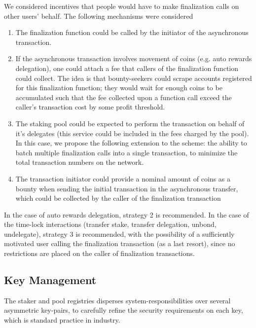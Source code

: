 We considered incentives that people would have to make finalization calls on other users' behalf. The following mechanisms were considered
\begin{enumerate}
    \item The finalization function could be called by the initiator of the asynchronous transaction. 
    \item If the asynchronous transaction involves movement of coins (e.g. auto rewards delegation), one could attach a fee that callers of the finalization function could collect. The idea is that bounty-seekers could scrape accounts registered for this finalization function; they would wait for enough coins to be accumulated such that the fee collected upon a function call exceed the caller's transaction cost by some profit threshold. 
    \item The staking pool could be expected to perform the transaction on behalf of it's delegates (this service could be included in the fees charged by the pool). In this case, we propose the following extension to the scheme: the ability to batch multiple finalization calls into a single transaction, to minimize the total transaction numbers on the network. 
    \item The transaction initiator could provide a nominal amount of coins as a bounty when sending the initial transaction in the asynchronous transfer, which could be collected by the caller of the finalization transaction
\end{enumerate}

In the case of auto rewards delegation, strategy 2 is recommended. In the case of the time-lock interactions (transfer stake, transfer delegation, unbond, undelegate), strategy 3 is recommended, with the possibility of a sufficiently motivated user calling the finalization transaction (as a last resort), since no restrictions are placed on the caller of finalization transactions. 

\subsection{Key Management} \label{key_management}
The staker and pool registries disperses system-responsibilities over several asymmetric key-pairs, to carefully refine the security requirements on each key, which is standard practice in industry.

